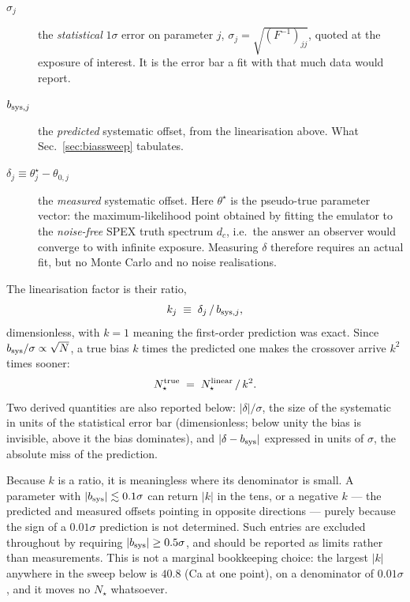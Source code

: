 \documentclass[11pt,a4paper]{article}
\begin{document}
\begin{description}
\item[$\sigma_j$] the \emph{statistical} $1\sigma$ error on parameter $j$,
$\sigma_j=\sqrt{(F^{-1})_{jj}}$, quoted at the exposure of interest. It is the
error bar a fit with that much data would report.
\item[$b_{{\rm sys},j}$] the \emph{predicted} systematic offset, from the
linearisation above. What Sec.~\ref{sec:biassweep} tabulates.
\item[$\delta_j \equiv \theta^\star_j-\theta_{0,j}$] the \emph{measured}
systematic offset. Here $\theta^\star$ is the pseudo-true parameter vector: the
maximum-likelihood point obtained by fitting the emulator to the
\emph{noise-free} SPEX truth spectrum $d_c$, i.e.\ the answer an observer would
converge to with infinite exposure. Measuring $\delta$ therefore requires an
actual fit, but no Monte Carlo and no noise realisations.
\end{description}

\noindent The linearisation factor is their ratio,
\begin{equation}
  k_j \;\equiv\; \delta_j\,/\,b_{{\rm sys},j},
  \label{eq:kdef}
\end{equation}
dimensionless, with $k=1$ meaning the first-order prediction was exact. Since
$b_{\rm sys}/\sigma\propto\sqrt{N}$, a true bias $k$ times the predicted one
makes the crossover arrive $k^2$ times sooner:
\begin{equation}
  N_\star^{\rm true} \;=\; N_\star^{\rm linear}\,/\,k^2 .
  \label{eq:nstarfactor}
\end{equation}
Two derived quantities are also reported below: $|\delta|/\sigma$, the size of
the systematic in units of the statistical error bar (dimensionless; below
unity the bias is invisible, above it the bias dominates), and
$|\delta-b_{\rm sys}|$ expressed in units of $\sigma$, the absolute miss of the
prediction.

Because $k$ is a ratio, it is meaningless where its denominator is small. A
parameter with $|b_{\rm sys}|\lesssim0.1\sigma$ can return $|k|$ in the tens,
or a negative $k$ --- the predicted and measured offsets pointing in opposite
directions --- purely because the sign of a $0.01\sigma$ prediction is not
determined. Such entries are excluded throughout by requiring
$|b_{\rm sys}|\ge0.5\sigma$, and should be reported as limits rather than
measurements. This is not a marginal bookkeeping choice: the largest $|k|$
anywhere in the sweep below is $40.8$ (Ca at one point), on a denominator of
$0.01\sigma$, and it moves no $N_\star$ whatsoever.
\end{document}
